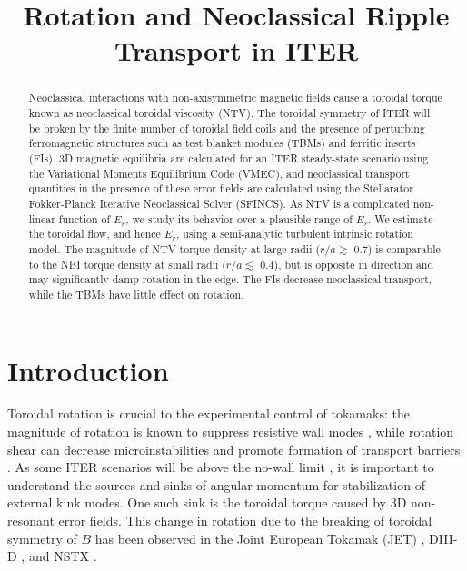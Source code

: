 \documentclass{article}
\title{Rotation and Neoclassical Ripple Transport in ITER}
\begin{document}
\maketitle

\begin{abstract}

Neoclassical interactions with non-axisymmetric magnetic fields cause a toroidal torque known as neoclassical toroidal viscosity (NTV). The toroidal symmetry of ITER will be broken by the finite number of toroidal field coils and the presence of perturbing ferromagnetic structures such as test blanket modules (TBMs) and ferritic inserts (FIs). 3D magnetic equilibria are calculated for an ITER steady-state scenario using the Variational Moments Equilibrium Code (VMEC), and neoclassical transport quantities in the presence of these error fields are calculated using the Stellarator Fokker-Planck Iterative Neoclassical Solver (SFINCS). As NTV is a complicated non-linear function of $E_r$, we study its behavior over a plausible range of $E_r$. We estimate the toroidal flow, and hence $E_r$, using a semi-analytic turbulent intrinsic rotation model. The magnitude of NTV torque density at large radii ($r/a \gtrsim$ 0.7) is comparable to the NBI torque density at small radii ($r/a \lesssim$ 0.4), but is opposite in direction and may significantly damp rotation in the edge. The FIs decrease neoclassical transport, while the TBMs have little effect on rotation. 
\end{abstract}

\section{Introduction}

Toroidal rotation is crucial to the experimental control of tokamaks: the magnitude of rotation is known to suppress resistive wall modes \cite{Bondeson1994, Garofalo2002}, while rotation shear can decrease microinstabilities and promote formation of transport barriers \cite{Burrell1997, Terry2000}. As some ITER scenarios will be above the no-wall limit \cite{Liu2004}, it is important to understand the sources and sinks of angular momentum for stabilization of external kink modes. One such sink is the toroidal torque caused by 3D non-resonant error fields. This change in rotation due to the breaking of toroidal symmetry of $B$ has been observed in the Joint European Tokamak (JET) \cite{Lazzaro2002, DeVries2008}, DIII-D \cite{Garofalo2008}, and NSTX \cite{Zhu2006}. 
\end{document}
